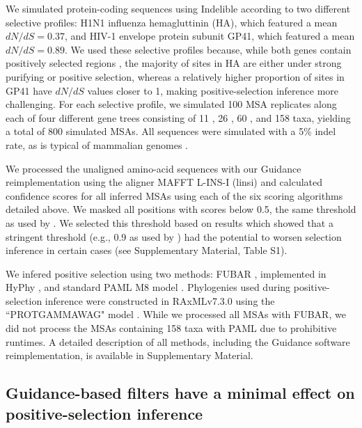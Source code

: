 \documentclass[11pt]{article}
\begin{document}
We simulated protein-coding sequences using Indelible \citep{Fletcher2009} according to two different selective profiles: H1N1 influenza hemagluttinin (HA), which featured a mean $dN/dS = 0.37$, and HIV-1 envelope protein subunit GP41, which featured a mean $dN/dS = 0.89$. We used these selective profiles because, while both genes contain positively selected regions \citep{Bush1999, Frost2001, Bandawe2008, Meyer2012}, the majority of sites in HA are either under strong purifying or positive selection, whereas a relatively higher proportion of sites in GP41 have $dN/dS$ values closer to 1, making positive-selection inference more challenging. For each selective profile, we simulated 100 MSA replicates along each of four different gene trees consisting of 11 \citep{Spielman2013}, 26 \citep{Spielman2013}, 60 \citep{Yang2011}, and 158 \citep{Betancur2013} taxa, yielding a total of 800 simulated MSAs. All sequences were simulated with a 5\% indel rate, as is typical of mammalian genomes \citep{Cooper2004}.

We processed the unaligned amino-acid sequences with our Guidance reimplementation using the aligner MAFFT L-INS-I (linsi) \citep{Katoh2002,Katoh2005} and calculated confidence scores for all inferred MSAs using each of the six scoring algorithms detailed above. We masked all positions with scores below 0.5, the same threshold as used by \citet{Jordan2012}. We selected this threshold based on results which showed that a stringent threshold (e.g., 0.9 as used by \citet{Privman2012}) had the potential to worsen selection inference in certain cases (see Supplementary Material, Table S1).

We infered positive selection using two methods: FUBAR \citep{Murrell2013}, implemented in HyPhy \citep{Pond2005}, and standard PAML M8 model \citep{Yang2000, Yang2007}. Phylogenies used during positive-selection inference were constructed in RAxMLv7.3.0 using the ``PROTGAMMAWAG" model \citep{Stamatakis2006}. While we processed all MSAs with FUBAR, we did not process the MSAs containing 158 taxa with PAML due to prohibitive runtimes. A detailed description of all methods, including the Guidance software reimplementation, is available in Supplementary Material.


\subsection*{Guidance-based filters have a minimal effect on positive-selection inference}
\end{document}
